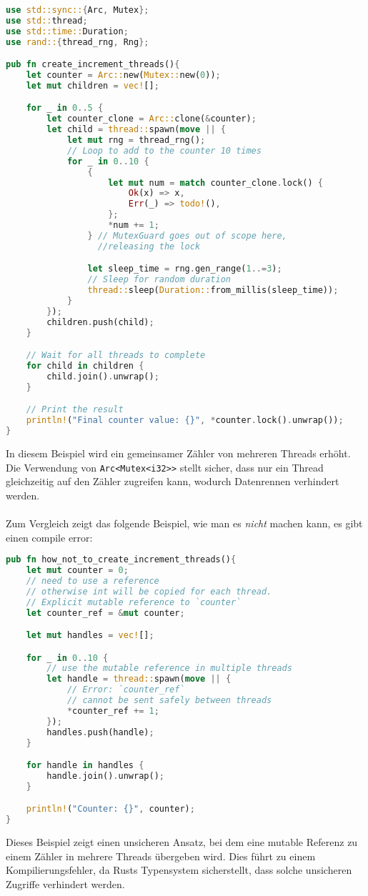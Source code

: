 \begin{lstlisting}[language=Rust, caption=Sicheres Erstellen von Threads mit Rust]
use std::sync::{Arc, Mutex};
use std::thread;
use std::time::Duration;
use rand::{thread_rng, Rng}; 

pub fn create_increment_threads(){
    let counter = Arc::new(Mutex::new(0));
    let mut children = vec![];

    for _ in 0..5 {
        let counter_clone = Arc::clone(&counter);
        let child = thread::spawn(move || {
            let mut rng = thread_rng(); 
            // Loop to add to the counter 10 times
            for _ in 0..10 { 
                {
                    let mut num = match counter_clone.lock() {
                        Ok(x) => x,
                        Err(_) => todo!(),
                    };
                    *num += 1;
                } // MutexGuard goes out of scope here, 
                  //releasing the lock

                let sleep_time = rng.gen_range(1..=3); 
                // Sleep for random duration
                thread::sleep(Duration::from_millis(sleep_time)); 
            }
        });
        children.push(child);
    }

    // Wait for all threads to complete
    for child in children {
        child.join().unwrap();
    }

    // Print the result
    println!("Final counter value: {}", *counter.lock().unwrap());
}
\end{lstlisting}
\noindent
In diesem Beispiel wird ein gemeinsamer Zähler von mehreren Threads erhöht. 
Die Verwendung von \texttt{Arc<Mutex<i32>>} stellt sicher, dass nur ein Thread gleichzeitig auf den Zähler zugreifen kann, wodurch Datenrennen verhindert werden.\\
\\
Zum Vergleich zeigt das folgende Beispiel, wie man es \emph{nicht} machen kann, es gibt einen compile error:

\begin{lstlisting}[language=Rust, caption=Unsicheres Erstellen von Threads in Rust]
pub fn how_not_to_create_increment_threads(){
    let mut counter = 0;
    // need to use a reference 
    // otherwise int will be copied for each thread.
    // Explicit mutable reference to `counter`
    let counter_ref = &mut counter; 

    let mut handles = vec![];

    for _ in 0..10 {
        // use the mutable reference in multiple threads
        let handle = thread::spawn(move || {
            // Error: `counter_ref` 
            // cannot be sent safely between threads
            *counter_ref += 1; 
        });
        handles.push(handle);
    }

    for handle in handles {
        handle.join().unwrap();
    }

    println!("Counter: {}", counter);
}
\end{lstlisting}
\noindent
Dieses Beispiel zeigt einen unsicheren Ansatz, bei dem eine mutable Referenz zu einem Zähler in mehrere Threads übergeben wird. 
Dies führt zu einem Kompilierungsfehler, da Rusts Typensystem sicherstellt, dass solche unsicheren Zugriffe verhindert werden.

